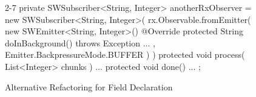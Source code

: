 \begin{figure}[H]
\begin{sourcecode}
\begin{javacode}{2-7}
private SWSubscriber<String, Integer> anotherRxObserver = new SWSubscriber<String, Integer>(
			rx.Observable.fromEmitter( 
				new SWEmitter<String, Integer>() {
					@Override
					protected String doInBackground() 
					throws Exception {...}
			}, Emitter.BackpressureMode.BUFFER )
	) {
	protected void process( List<Integer> chunks ) {...}
	protected void done() {...}
};	
\end{javacode}
\caption{Alternative Refactoring for Field Declaration}
\label{code:fd-alternative}
\end{sourcecode}
\end{figure}